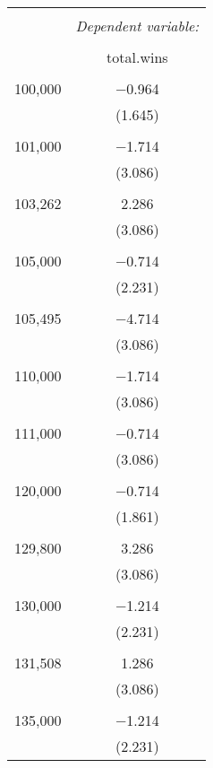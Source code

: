 \documentclass[12pt,english]{article}
\begin{document}
\begin{table}[!htbp] \centering 
  \caption{} 
  \label{} 
\begin{tabular}{@{\extracolsep{5pt}}lc} 
\\[-1.8ex]\hline 
\hline \\[-1.8ex] 
 & \multicolumn{1}{c}{\textit{Dependent variable:}} \\ 
\cline{2-2} 
\\[-1.8ex] & total.wins \\ 
\hline \\[-1.8ex] 
 100,000 & $-$0.964 \\ 
  & (1.645) \\ 
  & \\ 
 101,000 & $-$1.714 \\ 
  & (3.086) \\ 
  & \\ 
 103,262 & 2.286 \\ 
  & (3.086) \\ 
  & \\ 
 105,000 & $-$0.714 \\ 
  & (2.231) \\ 
  & \\ 
 105,495 & $-$4.714 \\ 
  & (3.086) \\ 
  & \\ 
 110,000 & $-$1.714 \\ 
  & (3.086) \\ 
  & \\ 
 111,000 & $-$0.714 \\ 
  & (3.086) \\ 
  & \\ 
 120,000 & $-$0.714 \\ 
  & (1.861) \\ 
  & \\ 
 129,800 & 3.286 \\ 
  & (3.086) \\ 
  & \\ 
 130,000 & $-$1.214 \\ 
  & (2.231) \\ 
  & \\ 
 131,508 & 1.286 \\ 
  & (3.086) \\ 
  & \\ 
 135,000 & $-$1.214 \\ 
  & (2.231) \\ 

\end{tabular}
\end{table}
\end{document}
